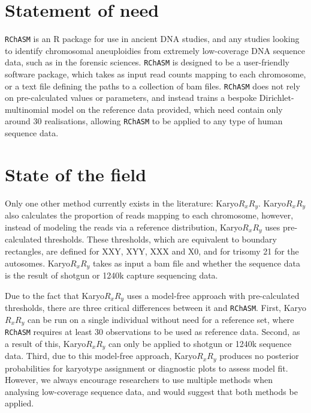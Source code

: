\documentclass[10pt,a4paper]{article}
\begin{document}
\section{Statement of need}

\texttt{RChASM} is an R package for use in ancient DNA studies, and any studies looking to identify chromosomal aneuploidies from extremely low-coverage DNA sequence data, such as in the forensic sciences. \texttt{RChASM} is designed to be a user-friendly software package, which takes as input read counts mapping to each chromosome, or a text file defining the paths to a collection of bam files. \texttt{RChASM} does not rely on pre-calculated values or parameters, and instead trains a bespoke Dirichlet-multinomial model on the reference data provided, which need contain only around 30 realisations, allowing \texttt{RChASM} to be applied to any type of human sequence data.

\section{State of the field}

Only one other method currently exists in the literature: Karyo$R_{x}R_{y}$\cite{anastasiadou2024detection}. Karyo$R_{x}R_{y}$ also calculates the proportion of reads mapping to each chromosome, however, instead of modeling the reads via a reference distribution, Karyo$R_{x}R_{y}$ uses pre-calculated thresholds. These thresholds, which are equivalent to boundary rectangles, are defined for XXY, XYY, XXX and X0, and for trisomy 21 for the autosomes. Karyo$R_{x}R_{y}$ takes as input a bam file and whether the sequence data is the result of shotgun\cite{venter2001sequence} or 1240k capture \cite{mathieson2018genomic} sequencing data. 

Due to the fact that Karyo$R_{x}R_{y}$ uses a model-free approach with pre-calculated thresholds, there are three critical differences between it and \texttt{RChASM}. First, Karyo$R_{x}R_{y}$ can be run on a single individual without need for a reference set, where \texttt{RChASM} requires at least 30 observations to be used as reference data. Second, as a result of this, Karyo$R_{x}R_{y}$ can only be applied to shotgun or 1240k sequence data. Third, due to this model-free approach, Karyo$R_{x}R_{y}$ produces no posterior probabilities for karyotype assignment or diagnostic plots to assess model fit. However, we always encourage researchers to use multiple methods when analysing low-coverage sequence data, and would suggest that both methods be applied.
\end{document}
